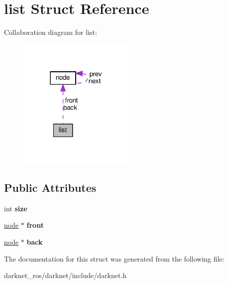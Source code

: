 \hypertarget{structlist}{}\section{list Struct Reference}
\label{structlist}


Collaboration diagram for list\+:\nopagebreak
\begin{figure}[H]
\begin{center}
\leavevmode
\includegraphics[width=158pt]{structlist__coll__graph}
\end{center}
\end{figure}
\subsection*{Public Attributes}
\begin{DoxyCompactItemize}
\item 
\mbox{\label{structlist_a3b03adad0c0429bae9493667ff366dc2}} 
int {\bfseries size}
\item 
\mbox{\label{structlist_ab5edf0018b269f7eae3d7100ddcea049}} 
\hyperlink{structnode}{node} $\ast$ {\bfseries front}
\item 
\mbox{\label{structlist_a92ca5a25484052f219cddb80380a3013}} 
\hyperlink{structnode}{node} $\ast$ {\bfseries back}
\end{DoxyCompactItemize}


The documentation for this struct was generated from the following file\+:\begin{DoxyCompactItemize}
\item 
darknet\+\_\+ros/darknet/include/darknet.\+h\end{DoxyCompactItemize}
